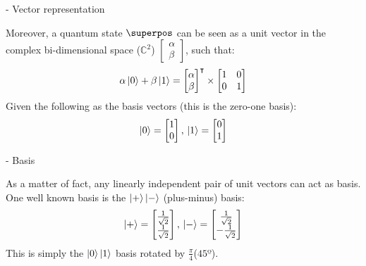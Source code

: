 \documentclass[aspectratio=43]{beamer}
\begin{document}
\begin{frame}{\qsp\space- Vector representation}
    \begin{cardTiny}
        Moreover, a quantum state $\superpos$ can be seen as a unit vector in the complex bi-dimensional space ($\mathbb{C}^2$) $\begin{bmatrix} \alpha \\ \beta \end{bmatrix}$, such that:
        \begin{equation*}
            \alpha \ket{0} + \beta \ket{1} =
            \begin{bmatrix}\alpha \\ \beta \end{bmatrix}^\intercal
            \times
            \begin{bmatrix}1 & 0\\ 0 & 1\end{bmatrix}
        \end{equation*}
        Given the following as the basis vectors (this is the zero-one basis):
        \begin{equation*}
            \ket{0} =  \begin{bmatrix}1 \\ 0\end{bmatrix},\\
            \ket{1} =  \begin{bmatrix}0 \\ 1\end{bmatrix}
        \end{equation*}
    \end{cardTiny}
\pagenumber
\end{frame}

\begin{frame}{\qsp\space- Basis}
    \begin{multicols}{2}
        As a matter of fact, any linearly independent pair of unit vectors can act as basis. One well known basis is the $\ket{+}\ket{-}$ (plus-minus) basis:
        \begin{equation*}
            \ket{+} =  \begin{bmatrix}\frac{1}{\sqrt{2}} \\ \frac{1}{\sqrt{2}}\end{bmatrix},\\
            \ket{-} =  \begin{bmatrix}\frac{1}{\sqrt{2}} \\ -\frac{1}{\sqrt{2}}\end{bmatrix}
        \end{equation*}
        This is simply the $\ket{0}\ket{1}$ basis rotated by $\frac{\pi}{4}$($45º$).
		\begin{center}
            
		\end{center}
    \end{multicols}
\pagenumber
\end{frame}
\end{document}

